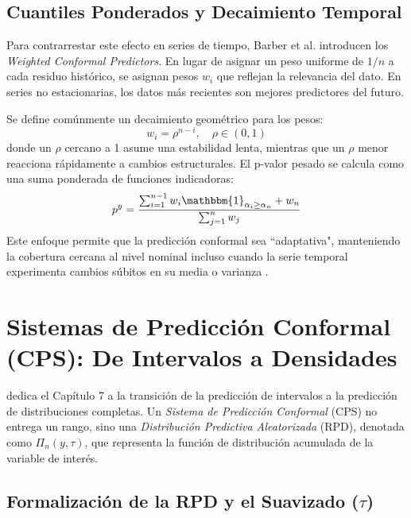 \subsection{Cuantiles Ponderados y Decaimiento Temporal}

Para contrarrestar este efecto en series de tiempo, Barber et al. introducen los \textit{Weighted Conformal Predictors}. En lugar de asignar un peso uniforme de $1/n$ a cada residuo histórico, se asignan pesos $w_i$ que reflejan la relevancia del dato. En series no estacionarias, los datos más recientes son mejores predictores del futuro.

Se define comúnmente un decaimiento geométrico para los pesos:
\begin{equation}
    w_i = \rho^{n-i}, \quad \rho \in (0, 1)
\end{equation}
donde un $\rho$ cercano a 1 asume una estabilidad lenta, mientras que un $\rho$ menor reacciona rápidamente a cambios estructurales. El p-valor pesado se calcula como una suma ponderada de funciones indicadoras:
\begin{equation}
    p^y = \frac{\sum_{i=1}^{n-1} w_i \mathbbm{1}_{\alpha_i \geq \alpha_n} + w_n}{\sum_{j=1}^n w_j}
\end{equation}
Este enfoque permite que la predicción conformal sea ``adaptativa", manteniendo la cobertura cercana al nivel nominal incluso cuando la serie temporal experimenta cambios súbitos en su media o varianza \parencite{Barber2023}.

\section{Sistemas de Predicción Conformal (CPS): De Intervalos a Densidades}
\label{sec:cps_densidades_LSPM}

\textcite{Vovk2005} dedica el Capítulo 7 a la transición de la predicción de intervalos a la predicción de distribuciones completas. Un \textit{Sistema de Predicción Conformal} (CPS) no entrega un rango, sino una \textit{Distribución Predictiva Aleatorizada} (RPD), denotada como $\Pi_n(y, \tau)$, que representa la función de distribución acumulada de la variable de interés.

\subsection{\texorpdfstring{Formalización de la RPD y el Suavizado ($\tau$)}{Formalización de la RPD y el Suavizado (tau)}}

